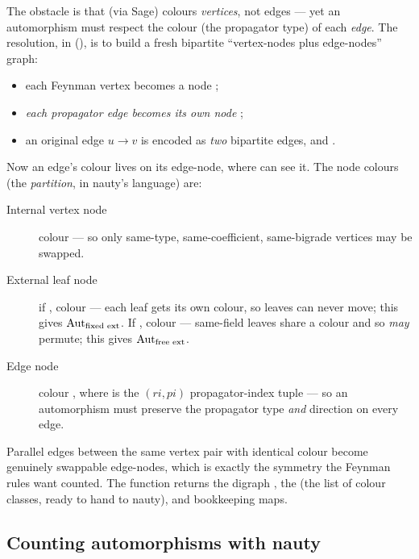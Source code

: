 The obstacle is that  (via Sage) colours \emph{vertices}, not edges
--- yet an automorphism must respect the colour (the propagator type) of each
\emph{edge}. The resolution, in 
(), is to build a fresh bipartite ``vertex-nodes plus
edge-nodes'' graph:

\begin{itemize}
  \item each Feynman vertex becomes a node ;
  \item \emph{each propagator edge becomes its own node} ;
  \item an original edge $u\to v$ is encoded as \emph{two} bipartite edges,
         and .
\end{itemize}

Now an edge's colour lives on its edge-node, where  can see it. The
node colours (the \emph{partition}, in nauty's language) are:

\begin{description}
  \item[Internal vertex node] colour
        --- so only same-type, same-coefficient, same-bigrade vertices may be
        swapped.
  \item[External leaf node] if , colour
         --- each leaf gets its own colour, so leaves can
        never move; this gives $\mathrm{Aut}_{\text{fixed ext}}$. If
        , colour  --- same-field
        leaves share a colour and so \emph{may} permute; this gives
        $\mathrm{Aut}_{\text{free ext}}$.
  \item[Edge node] colour , where
         is the $(ri, pi)$ propagator-index tuple --- so an
        automorphism must preserve the propagator type \emph{and} direction on
        every edge.
\end{description}

Parallel edges between the same vertex pair with identical colour become
genuinely swappable edge-nodes, which is exactly the symmetry the Feynman rules
want counted. The function returns the digraph , the 
(the list of colour classes, ready to hand to nauty), and bookkeeping maps.

\subsection{Counting automorphisms with nauty}

